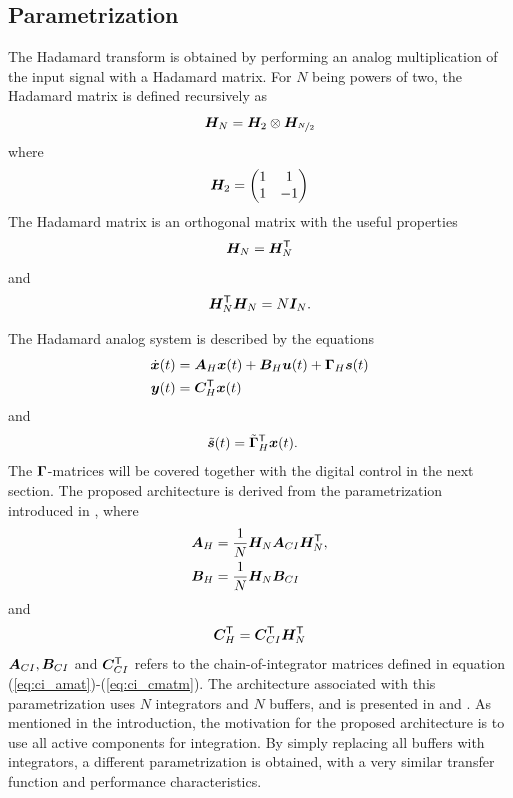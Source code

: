 \subsection{Parametrization}
The Hadamard transform is obtained by performing an analog multiplication of the input signal with a Hadamard matrix. For $N$ being powers of two, the Hadamard matrix is defined recursively as
\begin{equation}
    \label{eq:defn}
    \bm{H_}{N} = \bm{H_}{2} \otimes \bm{H_}{\nicefrac{N}{2}}
\end{equation}
where
\begin{equation}
    \label{eq:def2}
    \bm{H_}{2} =
    \begin{pmatrix}
    1 & 1 \\
    1 & -1
    \end{pmatrix}
\end{equation}
The Hadamard matrix is an orthogonal matrix with the useful properties
\begin{equation}
    \label{eq:Hmat_symmetry}
    \bm{H_}{N} = \bm{H_}{N}^\mathsf{T}
\end{equation}
and
\begin{equation}
    \label{eq:Hmat_inverse}
    \bm{H_}{N}^\mathsf{T}\bm{H_}{N} = N\bm{I}_{N}.
\end{equation}

The Hadamard analog system is described by the equations
\begin{align}
    \label{eq:hci_state_space_equations}
    \dot{\bm{x}}(t) & = \bm{A}_H \bm{x}(t) + \bm{B}_H \bm{u}(t) + \bm{\Gamma}_H \bm{s}(t) \\
    \bm{y}(t) & = \bm{C}^\mathsf{T}_H \bm{x}(t)
\end{align}
and
\begin{align}
    \tilde{\bm{s}}(t) & = \tilde{\bm{\Gamma}}^\mathsf{T}_H \bm{x}(t).
\end{align}
The $\bm{\Gamma}$-matrices will be covered together with the digital control in the next section. The proposed architecture is derived from the parametrization introduced in \cite{malmberg_thesis}, where
\begin{align}
    \bm{A}_H & = \frac{1}{N} \bm{H}_N \bm{A}_{CI} \bm{H}_N^\mathsf{T} \label{eq:AH_hampus}, \\
    \bm{B}_H & = \frac{1}{N} \bm{H}_N \bm{B}_{CI} \label{eq:BH_hampus}
\end{align}
and
\begin{equation}
    \label{eq:CH_hampus}
    \bm{C}^\mathsf{T}_H = \bm{C}^\mathsf{T}_{CI} \bm{H}_N^\mathsf{T}
\end{equation}
$\bm{A}_{CI}, \bm{B}_{CI}$ and $\bm{C}^\mathsf{T}_{CI}$ refers to the chain-of-integrator matrices defined in equation (\ref{eq:ci_amat})-(\ref{eq:ci_cmatm}). The architecture associated with this parametrization uses $N$ integrators and $N$ buffers, and is presented in \cite{malmberg_thesis} and \cite{malmberg_talk}. As mentioned in the introduction, the motivation for the proposed architecture is to use all active components for integration. By simply replacing all buffers with integrators, a different parametrization is obtained, with a very similar transfer function and performance characteristics.

